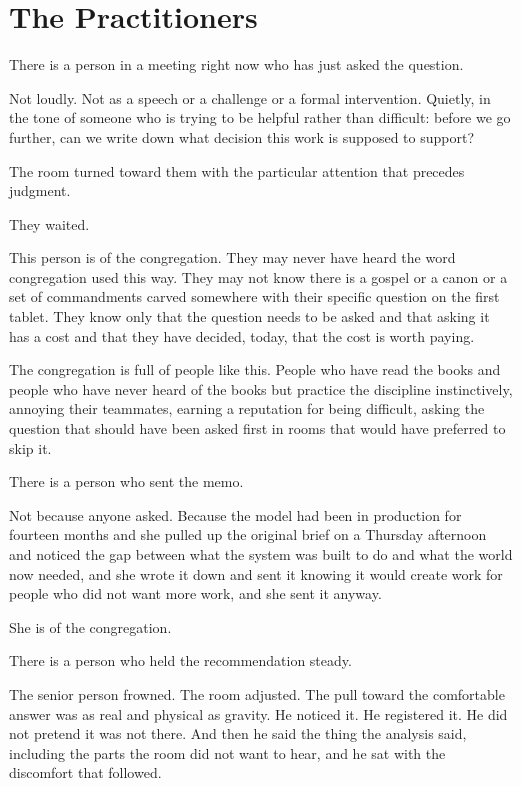 \section*{The Practitioners}

There is a person in a meeting right now who has just asked the question.

Not loudly. Not as a speech or a challenge or a formal intervention. Quietly, in the tone of someone who is trying to be helpful rather than difficult: before we go further, can we write down what decision this work is supposed to support?

The room turned toward them with the particular attention that precedes judgment.

They waited.

This person is of the congregation. They may never have heard the word congregation used this way. They may not know there is a gospel or a canon or a set of commandments carved somewhere with their specific question on the first tablet. They know only that the question needs to be asked and that asking it has a cost and that they have decided, today, that the cost is worth paying.

The congregation is full of people like this. People who have read the books and people who have never heard of the books but practice the discipline instinctively, annoying their teammates, earning a reputation for being difficult, asking the question that should have been asked first in rooms that would have preferred to skip it.

There is a person who sent the memo.

Not because anyone asked. Because the model had been in production for fourteen months and she pulled up the original brief on a Thursday afternoon and noticed the gap between what the system was built to do and what the world now needed, and she wrote it down and sent it knowing it would create work for people who did not want more work, and she sent it anyway.

She is of the congregation.

There is a person who held the recommendation steady.

The senior person frowned. The room adjusted. The pull toward the comfortable answer was as real and physical as gravity. He noticed it. He registered it. He did not pretend it was not there. And then he said the thing the analysis said, including the parts the room did not want to hear, and he sat with the discomfort that followed.

